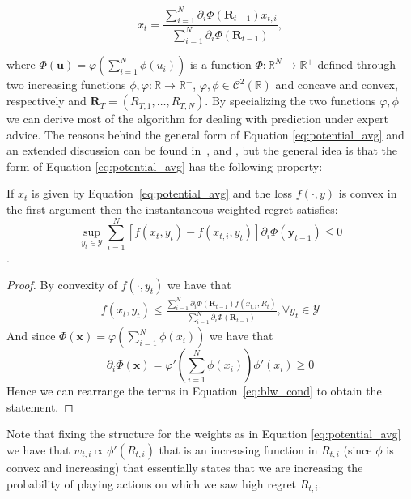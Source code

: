 \begin{equation}\label{eq:potential_avg}
x_t = \frac{\sum\limits_{i=1}^{N}\partial_i \Phi(\mathbf R_{t-1}) x_{t,i}}{\sum\limits_{i=1}^{N}\partial_i \Phi(\mathbf R_{t-1}) },
\end{equation}

where $\Phi(\mathbf u)=\varphi\left(\sum\limits_{i=1}^N\phi(u_i)\right)$ is a function $\Phi:\mathbb R^N\to\mathbb R^+$ defined through two increasing functions $\phi,\varphi:\mathbb R\to\mathbb R^+$, $\varphi,\phi\in\mathcal C^2(\mathbb R)$ and concave and convex, respectively and $\mathbf R_T=(R_{T,1},\ldots,R_{T,N})$.
By specializing the two functions $\varphi,\phi$ we can derive most of the algorithm for dealing with prediction under expert advice.
The reasons behind the general form of Equation \eqref{eq:potential_avg} and an extended discussion can be found in~\cite{hart2001general}, \cite{cesa2003potential} and \cite{blackwell1956analog}, but the general idea is that the form of Equation \eqref{eq:potential_avg} has the following property:

\begin{theorem}
	If $x_t$ is given by Equation~\eqref{eq:potential_avg} and the loss $f(\cdot,y)$ is convex in the first argument then the instantaneous weighted regret satisfies:  
	$$\sup\limits_{y_t\in\mathcal Y}\sum\limits_{i=1}^N[f(x_t,y_t)-f(x_{t,i},y_t)]\partial_i \Phi(\mathbf y_{t-1}) \le 0$$.
\end{theorem}

\begin{proof}
	By convexity of $f(\cdot,y_t)$ we have that 
\begin{align}
	f(x_t,y_t)\le\frac{\sum\limits_{i=1}^N\partial_i\Phi(\mathbf R_{t-1})f(x_{t,i},R_t)}{\sum\limits_{i=1}^N\partial_i\Phi(\mathbf R_{t-1})}, \forall y_t\in\mathcal Y\label{eq:blw_cond}
\end{align}
And since $\Phi(\mathbf x)=\varphi\left(\sum\limits_{i=1}^N \phi(x_i)\right)$ we have that $$\partial_i\Phi(\mathbf x)=\varphi'\left(\sum\limits_{i=1}^N\phi(x_i)\right)\phi'(x_i)\ge0$$
Hence we can rearrange the terms in Equation~\eqref{eq:blw_cond} to obtain the statement.
\end{proof}

Note that fixing the structure for the weights as in Equation \eqref{eq:potential_avg} we have that $w_{t,i}\propto\phi'(R_{t,i})$ that is an increasing function in $R_{t,i}$ (since $\phi$ is convex and increasing) that essentially states that we are increasing the probability of playing actions on which we saw high regret $R_{t,i}$.

